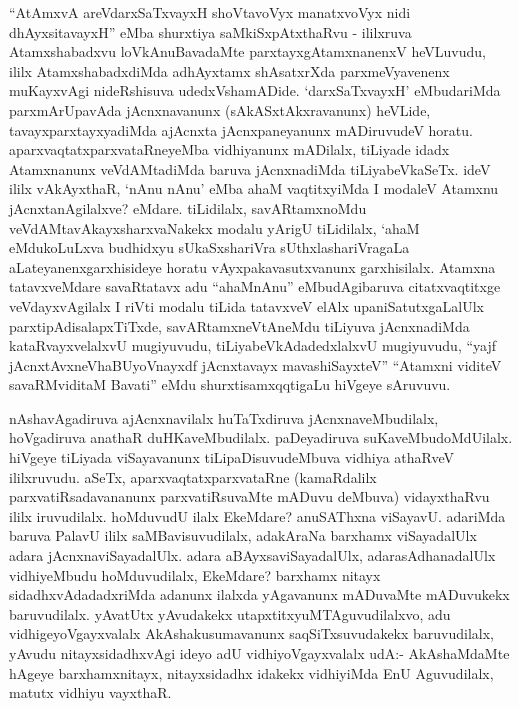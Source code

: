 \begin{artha}
``AtAmxvA areVdarxSaTxvayxH shoVtavoVyx manatxvoVyx nidi dhAyxsitavayxH'' eMba shurxtiya saMkiSxpAtxthaRvu -
ililxruva Atamxshabadxvu loVkAnuBavadaMte parxtayxgAtamxnanenxV
heVLuvudu, ililx AtamxshabadxdiMda adhAyxtamx shAsatxrXda
parxmeVyavenenx muKayxvAgi nideRshisuva udedxVshamADide. `darxSaTxvayxH'
eMbudariMda parxmArUpavAda jAcnxnavanunx  (sAkASxtAkxravanunx) heVLide,
tavayxparxtayxyadiMda ajAcnxta jAcnxpaneyanunx mADiruvudeV
horatu. aparxvaqtatxparxvataRneyeMba vidhiyanunx mADilalx, tiLiyade
idadx Atamxnanunx veVdAMtadiMda baruva jAcnxnadiMda
tiLiyabeVkaSeTx. ideV ililx vAkAyxthaR, `nAnu nAnu' eMba ahaM
vaqtitxyiMda I modaleV Atamxnu jAcnxtanAgilalxve? eMdare. tiLidilalx,
savARtamxnoMdu veVdAMtavAkayxsharxvaNakekx modalu yArigU tiLidilalx,
`ahaM eMdukoLuLxva budhidxyu sUkaSxshariVra sUthxlashariVragaLa
aLateyanenxgarxhisideye horatu vAyxpakavasutxvanunx
garxhisilalx. Atamxna tatavxveMdare savaRtatavx adu ``ahaMnAnu''
eMbudAgibaruva citatxvaqtitxge veVdayxvAgilalx I riVti
modalu tiLida tatavxveV elAlx upaniSatutxgaLalUlx
parxtipAdisalapxTiTxde, savARtamxneVtAneMdu tiLiyuva jAcnxnadiMda
kataRvayxvelalxvU mugiyuvudu, tiLiyabeVkAdadedxlalxvU mugiyuvudu,
``yajf jAcnxtAvxneVhaBUyoV\s nayxdf jAcnxtavayx mavashiSayxteV'' ``Atamxni viditeV savaRMviditaM Bavati'' eMdu shurxtisamxqqtigaLu hiVgeye sAruvuvu.
\end{artha}

\centerline{}

\begin{artha}
nAshavAgadiruva ajAcnxnavilalx huTaTxdiruva jAcnxnaveMbudilalx,
hoVgadiruva  anathaR duHKaveMbudilalx. paDeyadiruva
suKaveMbudoMdUilalx. hiVgeye tiLiyada viSayavanunx tiLipaDisuvudeMbuva
vidhiya athaRveV ililxruvudu. aSeTx, aparxvaqtatxparxvataRne
(kamaRdalilx parxvatiRsadavananunx parxvatiRsuvaMte mADuvu deMbuva)
vidayxthaRvu ililx iruvudilalx. hoMduvudU ilalx EkeMdare? anuSAThxna
viSayavU. adariMda baruva PalavU ililx saMBavisuvudilalx, adakAraNa
barxhamx viSayadalUlx adara jAcnxnaviSayadalUlx. adara
aBAyxsaviSayadalUlx, adarasAdhanadalUlx vidhiyeMbudu hoMduvudilalx,
EkeMdare? barxhamx nitayx sidadhxvAdadadxriMda adanunx ilalxda
yAgavanunx mADuvaMte mADuvukekx baruvudilalx. yAvatUtx  yAvudakekx
utapxtitxyuMTAguvudilalxvo, adu vidhigeyoVgayxvalalx
AkAshakusumavanunx saqSiTxsuvudakekx baruvudilalx, yAvudu
nitayxsidadhxvAgi ideyo adU vidhiyoVgayxvalalx udA:- AkAshaMdaMte
hAgeye barxhamxnitayx, nitayxsidadhx idakekx vidhiyiMda EnU
Aguvudilalx, matutx vidhiyu vayxthaR. 
\end{artha}

